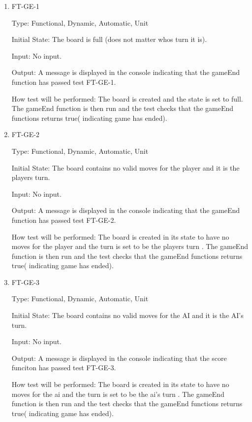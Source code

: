 \documentclass[12pt, titlepage]{article}
\begin{document}
\begin{enumerate}

	\item FT-GE-1

	      Type: Functional, Dynamic, Automatic, Unit

	      Initial State: The board is full (does not matter whos turn it is).

	      Input: No input.

	      Output: A message is displayed in the console indicating that the gameEnd function has passed test  FT-GE-1.

	      How test will be performed: The board is created and the state is set to full. The gameEnd function is then run and the test checks that the gameEnd functions returns true( indicating game has ended).



	\item FT-GE-2

	      Type: Functional, Dynamic, Automatic, Unit

	      Initial State: The board contains no valid moves for the player and it is the players turn.

	      Input: No input.

	      Output: A message is displayed in the console indicating that the gameEnd function has passed test  FT-GE-2.

	      How test will be performed: The board is created in its  state to have no moves for the player and the turn is set to be the players turn . The gameEnd function is then run and the test checks that the gameEnd functions returns true( indicating game has ended).



	\item FT-GE-3

	      Type: Functional, Dynamic, Automatic, Unit

	      Initial State: The board contains no valid moves for the AI and it is the AI's turn.

	      Input: No input.

	      Output:  A message is displayed in the console indicating that the score funciton has passed test  FT-GE-3.

	      How test will be performed: The board is created in its  state to have no moves for the ai and the turn is set to be the ai's turn . The gameEnd function is then run and the test checks that the gameEnd functions returns true( indicating game has ended).


\end{enumerate}
\end{document}

